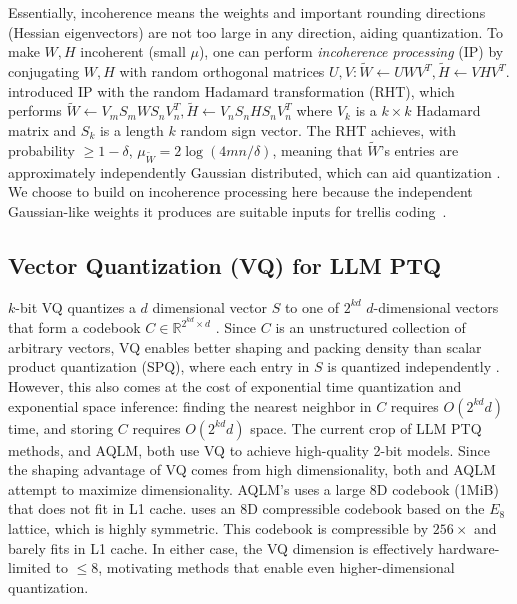 Essentially, incoherence means the weights and important rounding directions (Hessian eigenvectors) are not too large in any direction, aiding quantization. 
To make $W, H$ incoherent (small $\mu$), one can perform \textit{incoherence processing} (IP) by conjugating $W, H$ with random orthogonal matrices $U, V: \tilde W \gets UWV^T, \tilde H \gets VHV^T$.
\qss introduced IP with the random Hadamard transformation (RHT), which performs $ \tilde W \gets V_mS_mWS_nV_n^T, \tilde H \gets V_nS_nHS_nV_n^T$ where $V_k$ is a  $k\times k$ Hadamard matrix and $S_k$ is a length $k$ random sign vector.
The RHT achieves, with probability $\ge 1 - \delta$, $\mu_{\tilde W} = 2 \log (4mn / \delta)$, meaning that $\tilde W$'s entries are approximately independently Gaussian distributed, which can aid quantization \cite{tseng2024quip,ashkboos2024quarot}.
We choose to build on incoherence processing here because the independent Gaussian-like weights it produces are suitable inputs for trellis coding~\citep{rptc}.

\subsection{Vector Quantization (VQ) for LLM PTQ}

$k$-bit VQ quantizes a $d$ dimensional vector $S$ to one of $2^{kd}$ $d$-dimensional vectors that form a codebook $C \in \mathbb{R}^{2^{kd} \times d}$ \cite{linde1980algorithm}.
Since $C$ is an unstructured collection of arbitrary vectors, VQ enables better shaping and packing density than scalar product quantization (SPQ), where each entry in $S$ is quantized independently \cite{6145679}. 
However, this also comes at the cost of exponential time quantization and exponential space inference: finding the nearest neighbor in $C$ requires $O(2^{kd}d)$ time, and storing $C$ requires $O(2^{kd}d)$ space.
The current crop of \sota LLM PTQ methods, \qss and AQLM, both use VQ to achieve high-quality 2-bit models.
Since the shaping advantage of VQ comes from high dimensionality, both \qss and AQLM attempt to maximize dimensionality.
AQLM's uses a large 8D codebook (1MiB) that does not fit in L1 cache.
\qss uses an 8D compressible codebook based on the $E_8$ lattice, which is highly symmetric.
This codebook is compressible by $256\times$ and barely fits in L1 cache.
In either case, the VQ dimension is effectively hardware-limited to $\le 8$, motivating methods that enable even higher-dimensional quantization.


